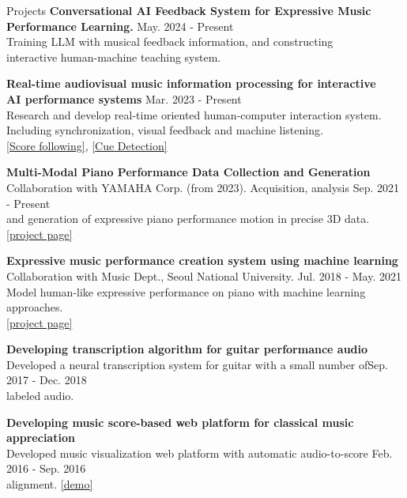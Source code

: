 \documentclass{resume} %
\begin{document}
\clearpage
\begin{rSection}{Projects}
{\bf Conversational AI Feedback System for Expressive Music \\Performance Learning.} \hfill {May. 2024 - Present}
\\Training LLM with musical feedback information, and constructing \\interactive human-machine teaching system.

{\bf Real-time audiovisual music information processing for interactive
\\AI performance systems} \hfill {Mar. 2023 - Present}
\\ Research and develop real-time oriented human-computer interaction system.
\\ Including synchronization, visual feedback and machine listening.
\\\href{https://mac.kaist.ac.kr/score_following/score_following.html}{[Score following]},
\href{https://mac.kaist.ac.kr/musical_cue_detection/musical_cue_detection.html}{[Cue Detection]}



{\bf Multi-Modal Piano Performance Data Collection and Generation}\\
Collaboration with YAMAHA Corp. (from 2023). Acquisition, analysis \hfill {Sep. 2021 - Present}
\\ and generation of expressive piano performance motion in  precise 3D data. \\\href{https://mac.kaist.ac.kr/Pianist_Multimodal_Data_Acquisition_and_Generation/Pianist_Multimodal_Data_Acquisition_and_Generation.html}{[project page]}

{\bf Expressive music performance creation system using machine learning}\\
Collaboration with Music Dept., Seoul National University. \hfill {Jul. 2018 - May. 2021}
\\Model human-like expressive performance on piano with machine learning approaches. \\\href{https://mac.kaist.ac.kr/expressive_piano_performance_rendering.html}{[project page]}

{\bf Developing transcription algorithm for guitar performance audio}\\
Developed a neural transcription system for guitar with a small number of\hfill {Sep. 2017 - Dec. 2018}
\\ labeled audio.

{\bf Developing music score-based web platform for classical music appreciation}\\
Developed music visualization web platform with automatic audio-to-score \hfill {Feb. 2016 - Sep. 2016}
\\alignment. \href{https://jdasam.github.io/PerformScore/}{[demo]}
\end{rSection}
\end{document}
